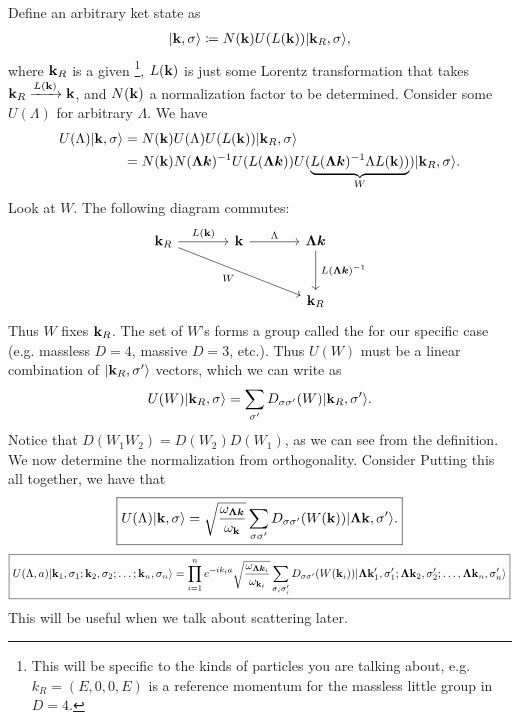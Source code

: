 \documentclass[11pt]{article}
\begin{document}
Define an arbitrary ket state as
\begin{align*}
    \lvert\mathbf{k}, \sigma\rangle \coloneqq N(\mathbf{k}) U(L(\mathbf{k})) \lvert\mathbf{k}_R, \sigma\rangle,
\end{align*}
where $\mathbf{k}_R$ is a given \footnote{This will
be specific to the kinds of particles you are talking about, e.g.
$k_R = (E, 0, 0, E)$ is a reference momentum for the massless little
group in $D = 4$.}, $L(\mathbf{k})$ is just some Lorentz transformation 
that takes $\mathbf{k}_R \xrightarrow{L(\mathbf{k})} \mathbf{k}$, and $N(\mathbf{k})$
a normalization factor to be determined. Consider some $U(\Lambda)$
for arbitrary $\Lambda$. We have
\begin{align*}
    U(\Lambda) \lvert\mathbf{k}, \sigma\rangle & = N(\mathbf{k}) U(\Lambda) U(L(\mathbf{k})) \lvert\mathbf{k}_R, \sigma\rangle\\
    & = N(\mathbf{k}) N(\boldsymbol{\Lambda k})^{-1} U(L(\boldsymbol{\Lambda k})) U(\underbrace{L(\boldsymbol{\Lambda k})^{-1} \Lambda L(\mathbf{k}))}_{W}) \lvert\mathbf{k}_R, \sigma\rangle.
\end{align*}
Look at $W$. The following diagram commutes:
\[
    \begin{tikzcd}[column sep=large, row sep=large]
    \bfk_R \arrow[r, "\,L(\bfk)\,"] \arrow[rrd, "\,W\,"'] & \bfk \arrow[r, "\,\Lambda\,"] & \boldsymbol{\Lambda k} \arrow[d, "\,L(\boldsymbol{\Lambda k})^{-1}\,"] \\
    & & \bfk_R
    \end{tikzcd}
\]
Thus $W$ fixes $\mathbf{k}_R$. The set of $W$'s forms a group called the
 for our specific case (e.g. massless $D = 4$,
massive $D = 3$, etc.). Thus $U(W)$ must be a linear combination of
$\lvert\mathbf{k}_R, \sigma'\rangle$ vectors, which we can write as
\begin{align*}
    U(W) \lvert\mathbf{k}_R, \sigma\rangle = \sum_{\sigma'} D_{\sigma \sigma'}(W) \lvert\mathbf{k}_R, \sigma'\rangle.
\end{align*}
Notice that $D(W_1 W_2) = D(W_2) D(W_1)$, as we can see from the definition.
We now determine the normalization from orthogonality. Consider 
Putting this all together, we have that
\begin{align*}
    \boxed{U(\Lambda)\lvert\mathbf{k}, \sigma\rangle = \sqrt{\frac{\omega_{\boldsymbol{\Lambda k}}}{\omega_{\mathbf{k}}}}\sum_{\sigma \sigma'} D_{\sigma \sigma'}(W(\mathbf{k})) \lvert\boldsymbol{\Lambda \mathbf{k}}, \sigma'\rangle.}
\end{align*}
\begin{align*}
    \boxed{U(\Lambda, a)\lvert\mathbf{k}_1, \sigma_1; \mathbf{k}_2, \sigma_2; \ldots ; \mathbf{k}_n, \sigma_n\rangle
    = \prod_{i = 1}^n e^{-i k_i a}\sqrt{\frac{\omega_{\boldsymbol{\Lambda k}_i}}{\omega_{\mathbf{k}_i}}} \sum_{\sigma_i \sigma_i'} D_{\sigma \sigma'}(W(\mathbf{k}_i)) \lvert\boldsymbol{\Lambda \mathbf{k}}_1', \sigma_1'; \boldsymbol{\Lambda \mathbf{k}}_2, \sigma_2'; \ldots, \boldsymbol{\Lambda \mathbf{k}}_n, \sigma_n'\rangle}
\end{align*}
This will be useful when we talk about scattering later.
\end{document}
